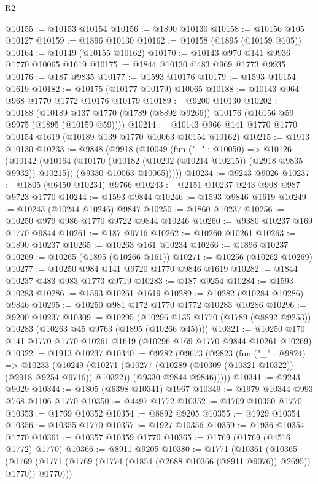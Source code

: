 \begin{lexlean}{R2}
\begin{coremodule}
@10155 := @10153 @10154
@10156 := @1890 @10130
@10158 := @10156 @105 @10127
@10159 := @1896 @10130
@10162 := @10158 (@1895 (@10159 @105))
@10164 := @10149 (@10155 @10162)
@10170 := @10143 @970 @141 @9936 @1770 @10065 @1619
@10175 := @1844 @10130 @483 @969 @1773 @9935
@10176 := @187 @9835
@10177 := @1593 @10176
@10179 := @1593 @10154 @1619
@10182 := @10175 (@10177 @10179) @10065
@10188 := @10143 @964 @968 @1770 @1772 @10176 @10179
@10189 := @9200 @10130
@10202 := @10188
    (@10189 @137 @1770 (@1789 (@8892 @9266)) @10176 (@10156 @59 @9975 (@1895 (@10159 @59))))
@10214 := @10143 @966 @141 @1770 @1770 @10154 @1619 (@10189 @139 @1770 @10063 @10154 @10162)
@10215 := @1913 @10130
@10233 := @9848
    (@9918
      (@10049
        (fun ("_" : @10050) =>
        @10126
          (@10142
            (@10164 (@10170 (@10182 (@10202 (@10214 @10215)) (@2918 @9835 @9932)) @10215))
            (@9330 @10063 @10065)))))
@10234 := @9243 @9026
@10237 := @1805 (@6450 @10234) @9766
@10243 := @2151 @10237 @243 @908 @987 @9723 @1770
@10244 := @1593 @9844
@10246 := @1593 @9846 @1619
@10249 := @10243 (@10244 @10246) @9847
@10250 := @1860 @10237
@10256 := @10250 @979 @986 @1770 @9722 @9844 @10246
@10260 := @9380 @10237 @169 @1770 @9844
@10261 := @187 @9716
@10262 := @10260 @10261
@10263 := @1890 @10237
@10265 := @10263 @161 @10234
@10266 := @1896 @10237
@10269 := @10265 (@1895 (@10266 @161))
@10271 := @10256 (@10262 @10269)
@10277 := @10250 @984 @141 @9720 @1770 @9846 @1619
@10282 := @1844 @10237 @483 @983 @1773 @9719
@10283 := @187 @9254
@10284 := @1593 @10283
@10286 := @1593 @10261 @1619
@10289 := @10282 (@10284 @10286) @9846
@10295 := @10250 @981 @172 @1770 @1772 @10283 @10286
@10296 := @9200 @10237
@10309 := @10295
    (@10296 @135 @1770 (@1789 (@8892 @9253)) @10283 (@10263 @45 @9763 (@1895 (@10266 @45))))
@10321 := @10250 @170 @141 @1770 @1770 @10261 @1619 (@10296 @169 @1770 @9844 @10261 @10269)
@10322 := @1913 @10237
@10340 := @9282
    (@9673
      (@9823
        (fun ("_" : @9824) =>
        @10233
          (@10249
            (@10271 (@10277 (@10289 (@10309 (@10321 @10322)) (@2918 @9254 @9716)) @10322))
            (@9330 @9844 @9846)))))
@10341 := @9243 @9029
@10344 := @1805 (@6398 @10341) @1967
@10349 := @1979 @10344 @993 @768 @1106 @1770
@10350 := @4497 @1772
@10352 := @1769 @10350 @1770
@10353 := @1769 @10352
@10354 := @8892 @9205
@10355 := @1929 @10354
@10356 := @10355 @1770
@10357 := @1927 @10356
@10359 := @1936 @10354 @1770
@10361 := @10357 @10359 @1770
@10365 := @1769 (@1769 (@4516 @1772) @1770)
@10366 := @8911 @9205
@10380 := @1771
    (@10361
      (@10365
        (@1769 (@1771 (@1769 (@1774 (@1854 (@2688 @10366 (@8911 @9076)) @2695)) @1770)) @1770)))

\end{coremodule}
\end{lexlean}
